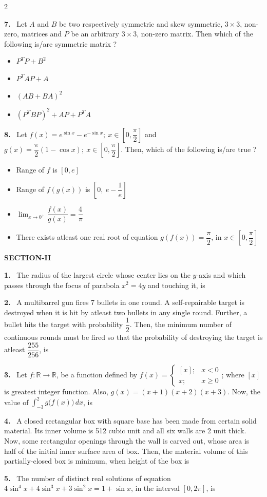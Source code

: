 \documentclass[10pt]{extarticle}
\newcommand{\sect}[1]{\par\smallskip\noindent\textbf{#1}\par}
\newcommand{\qn}[1]{\par\smallskip\noindent\textbf{#1.}~}
\newenvironment{qoptions}{\begin{itemize}[leftmargin=1.8em,itemsep=1pt,topsep=2pt,label={}]}{\end{itemize}}
\newcommand{\opt}[2]{\item[(#1)] #2}
\begin{document}
\begin{multicols}{2}
\qn{7} Let $A$ and $B$ be two respectively symmetric and skew symmetric, $3\times3$, non-zero, matrices and $P$ be an arbitrary $3\times3$, non-zero matrix. Then which of the following is/are symmetric matrix ?
\begin{qoptions}
\opt{A}{$P^TP+B^2$}
\opt{B}{$P^TAP+A$}
\opt{C}{$(AB+BA)^2$}
\opt{D}{$(P^TBP)^2+AP+P^TA$}
\end{qoptions}

\qn{8} Let $f(x)=e^{\sin x}-e^{-\sin x};\ x\in\left[0,\dfrac\pi2\right]$ and $g(x)=\dfrac\pi2(1-\cos x);\ x\in\left[0,\dfrac\pi2\right]$. Then, which of the following is/are true ?
\begin{qoptions}
\opt{A}{Range of $f$ is $[0,e]$}
\opt{B}{Range of $f(g(x))$ is $\left[0,\ e-\dfrac1e\right]$}
\opt{C}{$\displaystyle\lim_{x\to0^+}\dfrac{f(x)}{g(x)}=\dfrac4\pi$}
\opt{D}{There exists atleast one real root of equation $g(f(x))=\dfrac\pi2$, in $x\in\left[0,\dfrac\pi2\right]$}
\end{qoptions}

\sect{SECTION-II}
\qn{1} The radius of the largest circle whose center lies on the $y$-axis and which passes through the focus of parabola $x^2=4y$ and touching it, is

\qn{2} A multibarrel gun fires 7 bullets in one round. A self-repairable target is destroyed when it is hit by atleast two bullets in any single round. Further, a bullet hits the target with probability $\dfrac12$. Then, the minimum number of continuous rounds must be fired so that the probability of destroying the target is atleast $\dfrac{255}{256}$, is

\qn{3} Let $f:\mathbb R\to\mathbb R$, be a function defined by $f(x)=\begin{cases}[x]; & x<0\\ x; & x\ge0\end{cases}$; where $[x]$ is greatest integer function. Also, $g(x)=(x+1)(x+2)(x+3)$. Now, the value of $\displaystyle\int_{-3}^{2}g\big(f(x)\big)\,dx$, is

\qn{4} A closed rectangular box with square base has been made from certain solid material. Its inner volume is 512 cubic unit and all six walls are 2 unit thick. Now, some rectangular openings through the wall is carved out, whose area is half of the initial inner surface area of box. Then, the material volume of this partially-closed box is minimum, when height of the box is

\qn{5} The number of distinct real solutions of equation $4\sin^4x+4\sin^3x+3\sin^2x=1+\sin x$, in the interval $[0,2\pi]$, is


\end{multicols}
\end{document}
